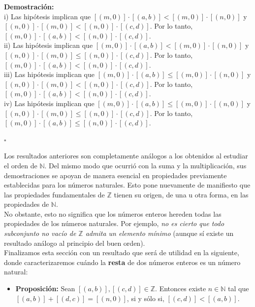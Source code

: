 \documentclass[10 pt]{article}
\begin{document}
\Large{\textbf{Demostración:} \\

i) Las hipótesis implican que $[(m,0)] \cdot [(a,b)]<[(m,0)] \cdot [(n,0)]$ y $[(n,0)] \cdot [(m,0)]<[(n,0)] \cdot [(c,d)]$. Por lo tanto, $[(m,0)] \cdot [(a,b)]<[(n,0)] \cdot [(c,d)]$. \\

ii) Las hipótesis implican que $[(m,0)] \cdot [(a,b)]<[(m,0)] \cdot [(n,0)]$ y $[(n,0)] \cdot [(m,0)] \leq [(n,0)] \cdot [(c,d)]$. Por lo tanto, $[(m,0)] \cdot [(a,b)]<[(n,0)] \cdot [(c,d)]$. \\

iii) Las hipótesis implican que $[(m,0)] \cdot [(a,b)] \leq [(m,0)] \cdot [(n,0)]$ y $[(n,0)] \cdot [(m,0)]<[(n,0)] \cdot [(c,d)]$. Por lo tanto, $[(m,0)] \cdot [(a,b)]<[(n,0)] \cdot [(c,d)]$. \\

iv) Las hipótesis implican que $[(m,0)] \cdot [(a,b)] \leq [(m,0)] \cdot [(n,0)]$ y $[(n,0)] \cdot [(m,0)] \leq [(n,0)] \cdot [(c,d)]$. Por lo tanto, $[(m,0)] \cdot [(a,b)] \leq [(n,0)] \cdot [(c,d)]$.} \\

\begin{flushright}
    $\square$
\end{flushright}

\Large{Los resultados anteriores son completamente análogos a los obtenidos al estudiar el orden de $\mathbb N$. Del mismo modo que ocurrió con la suma y la multiplicación, sus demostraciones se apoyan de manera esencial en propiedades previamente establecidas para los números naturales. Esto pone nuevamente de manifiesto que las propiedades fundamentales de $\mathbb Z$ tienen su origen, de una u otra forma, en las propiedades de $\mathbb N$. \\

No obstante, esto no significa que los números enteros hereden todas las propiedades de los números naturales. Por ejemplo, \textit{no es cierto que todo subconjunto no vacío de $\mathbb Z$ admita un elemento mínimo} (aunque sí existe un resultado análogo al principio del buen orden).} \\

\Large{Finalizamos esta sección con un resultado que será de utilidad en la siguiente, donde caracterizaremos cuándo la \textbf{resta} de dos números enteros es un número natural:} \\

\begin{itemize}
    \item \Large{\textbf{Proposición:} Sean $[(a,b)],[(c,d)] \in \mathbb Z$. Entonces existe $n \in \mathbb N$ tal que $[(a,b)]+[(d,c)]=[(n,0)]$, si y sólo si, $[(c,d)]<[(a,b)]$.} \\
\end{itemize}
\end{document}
